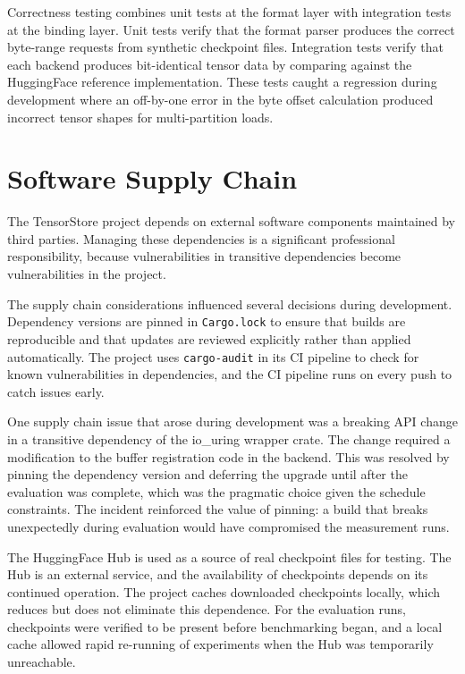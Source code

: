 Correctness testing combines unit tests at the format layer with integration tests at the binding layer. Unit tests verify that the format parser produces the correct byte-range requests from synthetic checkpoint files. Integration tests verify that each backend produces bit-identical tensor data by comparing against the HuggingFace reference implementation. These tests caught a regression during development where an off-by-one error in the byte offset calculation produced incorrect tensor shapes for multi-partition loads.

\section{Software Supply Chain}

The TensorStore project depends on external software components maintained by third parties. Managing these dependencies is a significant professional responsibility, because vulnerabilities in transitive dependencies become vulnerabilities in the project.

The supply chain considerations influenced several decisions during development. Dependency versions are pinned in \texttt{Cargo.lock} to ensure that builds are reproducible and that updates are reviewed explicitly rather than applied automatically. The project uses \texttt{cargo-audit} in its CI pipeline to check for known vulnerabilities in dependencies, and the CI pipeline runs on every push to catch issues early.

One supply chain issue that arose during development was a breaking API change in a transitive dependency of the io\_uring wrapper crate. The change required a modification to the buffer registration code in the backend. This was resolved by pinning the dependency version and deferring the upgrade until after the evaluation was complete, which was the pragmatic choice given the schedule constraints. The incident reinforced the value of pinning: a build that breaks unexpectedly during evaluation would have compromised the measurement runs.

The HuggingFace Hub is used as a source of real checkpoint files for testing. The Hub is an external service, and the availability of checkpoints depends on its continued operation. The project caches downloaded checkpoints locally, which reduces but does not eliminate this dependence. For the evaluation runs, checkpoints were verified to be present before benchmarking began, and a local cache allowed rapid re-running of experiments when the Hub was temporarily unreachable.

